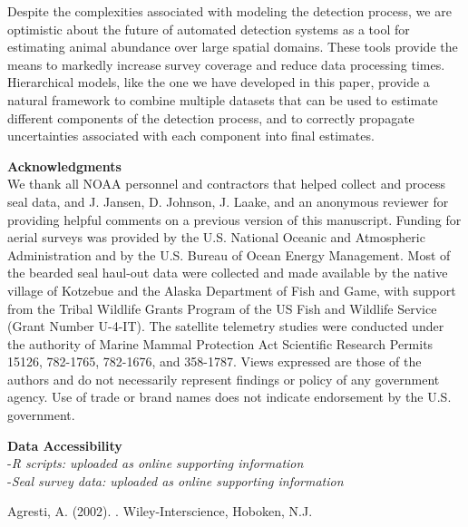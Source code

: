 \documentclass[12pt,fleqn]{article}
\renewcommand{\em}{\it}
\begin{document}
\begin{flushleft}
\hspace{.5in} Despite the complexities associated with modeling the detection process, we are optimistic about the future of automated detection systems as a tool for estimating animal abundance over large spatial domains.  These tools provide the means to markedly increase survey coverage and reduce data processing times.  Hierarchical models, like the one we have developed in this paper, provide a natural framework to combine multiple datasets that can be used to estimate different components of the detection process, and to correctly propagate uncertainties associated with each component into final estimates.

\vspace{.3in}
{\bf Acknowledgments} \\
\vspace{.15in}
We thank all NOAA personnel and contractors that helped collect and process seal data, and J. Jansen, D. Johnson, J. Laake, and an anonymous reviewer for providing helpful comments on a previous version of this manuscript.  Funding for aerial surveys was provided
by the U.S. National Oceanic and Atmospheric Administration and by the U.S. Bureau of Ocean Energy Management.  Most of the bearded seal haul-out data
were collected and made available by the native village of Kotzebue and the Alaska Department of Fish
and Game, with support from the Tribal Wildlife Grants Program of the US Fish and Wildlife Service
(Grant Number U-4-IT). The satellite telemetry studies were conducted under the authority of Marine
Mammal Protection Act Scientific Research Permits 15126, 782-1765, 782-1676, and 358-1787. Views expressed are those of the authors and do not necessarily represent findings or policy of any government agency.  Use of trade or brand names does not indicate endorsement by the U.S. government.


\vspace{.3in}
{\bf Data Accessibility} \\
\vspace{.15in}
-{\it R scripts: uploaded as online supporting information} \\
-{\it Seal survey data: uploaded as online supporting information}

%
%
\begin{thebibliography}{39}
\providecommand{\natexlab}[1]{#1}

Agresti, A. (2002).
\newblock {\em Categorical Data Analysis, 2nd Edition\/}.
\newblock Wiley-Interscience, Hoboken, N.J.


\end{thebibliography}
\end{flushleft}
\end{document}

